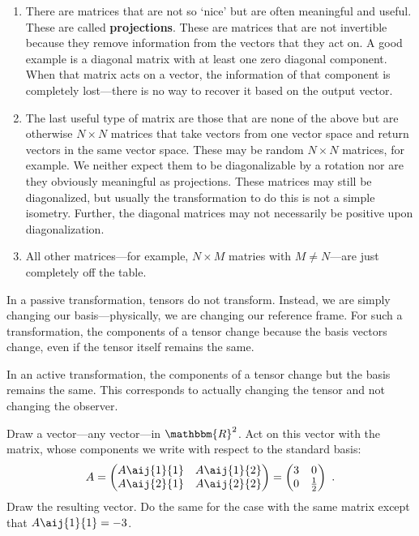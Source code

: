 \begin{enumerate}
    \item There are matrices that are not so `nice' but are often meaningful and useful. These are called \textbf{projections}. These are matrices that are not invertible because they remove information from the vectors that they act on. A good example is a diagonal matrix with at least one zero diagonal component. When that matrix acts on a vector, the information of that component is completely lost---there is no way to recover it based on the output vector. 
    \item The last useful type of matrix are those that are none of the above but are otherwise $N\times N$ matrices that take vectors from one vector space and return vectors in the same vector space. These may be random $N\times N$ matrices, for example. We neither expect them to be diagonalizable by a rotation nor are they obviously meaningful as projections. These matrices may still be diagonalized, but usually the transformation to do this is not a simple isometry. Further, the diagonal matrices may not necessarily be positive upon diagonalization.
    \item All other matrices---for example, $N\times M$ matries with $M\neq N$---are just completely off the table. 
\end{enumerate}

\begin{example} In a passive transformation, tensors do not transform. Instead, we are simply changing our basis---physically, we are changing our reference frame. For such a transformation, the components of a tensor change because the basis vectors change, even if the tensor itself remains the same. 

In an active transformation, the components of a tensor change but the basis remains the same. This corresponds to actually changing the tensor and not changing the observer.
\end{example}

\begin{exercise}
Draw a vector---any vector---in $\mathbbm{R}^2$. Act on this vector with the matrix, whose components we write with respect to the standard basis:
\begin{align}
    A = \begin{pmatrix}
        A\aij{1}{1} & A\aij{1}{2}\\
        A\aij{2}{1} & A\aij{2}{2}
    \end{pmatrix}
    =
    \begin{pmatrix}
        3 & 0\\
        0 & \frac{1}{2}
    \end{pmatrix} \ .
\end{align}
Draw the resulting vector. Do the same for the case with the same matrix except that $A\aij{1}{1} = -3$.
\end{exercise}


